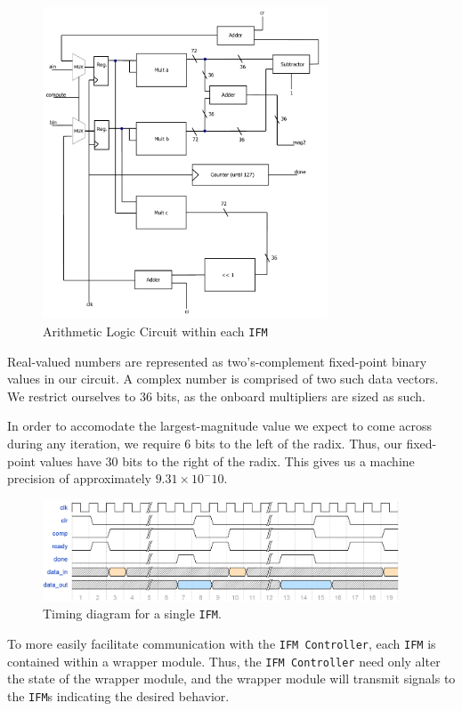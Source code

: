 \documentclass{article}
\begin{document}
\begin{figure}[H]
  \centering
    \includegraphics[width=240pt]{block_diagrams/ifm.pdf}
  \caption{Arithmetic Logic Circuit within each \texttt{IFM}}
\end{figure}

Real-valued numbers are represented as two's-complement fixed-point binary
values in our circuit. A complex number is comprised of two such data vectors. 
We restrict ourselves to 36 bits, as the onboard multipliers
are sized as such. 

In order to accomodate the largest-magnitude value we
expect to come across during any iteration, we require 6 bits to the
left of the radix. Thus, our fixed-point values have 30 bits to the
right of the radix. This gives us a machine precision of approximately
$9.31 \times 10 ^ -10$.

\begin{figure}[H]
  \centering
    \includegraphics[width=300pt]{timing_diagrams/IFM.PNG}
  \caption{Timing diagram for a single \texttt{IFM}.}
\end{figure}


To more easily facilitate communication with the \texttt{IFM Controller}, each \texttt{IFM} is contained within a wrapper module.
Thus, the \texttt{IFM Controller} need only alter the state of the wrapper module, and the wrapper module will transmit signals to the \texttt{IFM}s indicating the desired behavior.
\end{document}
